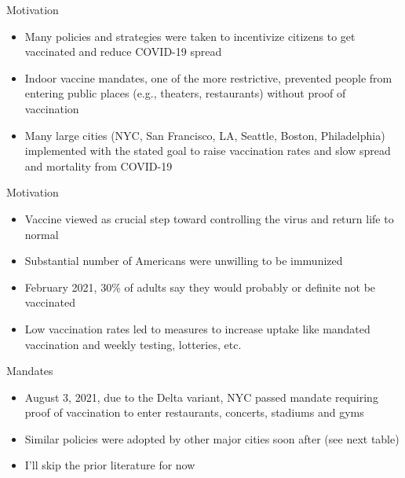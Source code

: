\documentclass{beamer}
\begin{document}
\begin{frame}{Motivation}

\begin{itemize}
\item Many policies and strategies were taken to incentivize citizens to get vaccinated and reduce COVID-19 spread
\item Indoor vaccine mandates, one of the more restrictive, prevented people from entering public places (e.g., theaters, restaurants) without proof of vaccination
\item Many large cities (NYC, San Francisco, LA, Seattle, Boston, Philadelphia) implemented with the stated goal to raise vaccination rates and slow spread and mortality from COVID-19
\end{itemize}

\end{frame}

\begin{frame}{Motivation}

\begin{itemize}
\item Vaccine viewed as crucial step toward controlling the virus and return life to normal
\item Substantial number of Americans were unwilling to be immunized
\item February 2021, 30\% of adults say they would probably or definite not be vaccinated
\item Low vaccination rates led to measures to increase uptake like mandated vaccination and weekly testing, lotteries, etc.

\end{itemize}

\end{frame}

\begin{frame}{Mandates}

\begin{itemize}
\item August 3, 2021, due to the Delta variant, NYC passed mandate requiring proof of vaccination to enter restaurants, concerts, stadiums and gyms
\item Similar policies were adopted by other major cities soon after (see next table)
\item I'll skip the prior literature for now
\end{itemize}

\end{frame}
\end{document}
